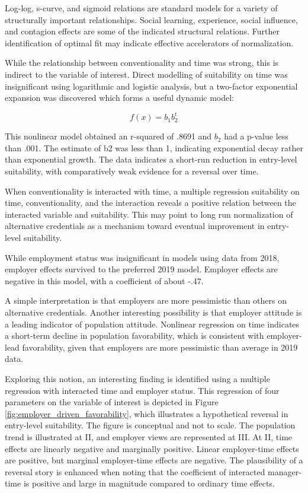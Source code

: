 \documentclass[AER]{./aea-latex-templates/AEA}
\begin{document}
Log-log, s-curve, and sigmoid relations are standard models for a variety of structurally important relationships.
Social learning, experience, social influence, and contagion effects are some of the
indicated structural relations\cite{young2009innovation}.
Further identification of optimal fit may indicate effective accelerators of normalization.

While the relationship between conventionality and time was strong,
this is indirect to the variable of interest. Direct modelling of suitability
on time was insignificant using logarithmic and logistic analysis, but
a two-factor exponential expansion was discovered which forms a useful dynamic model:

\begin{equation} f(x) = b_1b_2^t \end{equation}

This nonlinear model obtained an r-squared of .8691 and $b_2$ had a p-value
less than .001. The estimate of b2 was less than 1, indicating exponential
decay rather than exponential growth. The data indicates a short-run reduction in entry-level
suitability, with comparatively weak evidence for a reversal over time.

When conventionality is interacted with time, a multiple regression suitability on time, conventionality, and the interaction
reveals a positive relation between the interacted variable and suitability.
This may point to long run normalization of alternative credentials as a mechanism toward eventual improvement in entry-level suitability.

While employment status was insignificant in models using data from 2018,
employer effects survived to the preferred 2019 model.
Employer effects are negative in this model, with a coefficient of about -.47.

A simple interpretation is that employers are more pessimistic than others
on alternative credentials. Another interesting possibility is that employer attitude is a leading indicator of population attitude.
Nonlinear regression on time indicates a short-term decline in population favorability,
which is consistent with employer-lead favorability, given that employers are more pessimistic than average in 2019 data.

Exploring this notion, an interesting finding is identified using a multiple regression with interacted time and employer status.
This regression of four parameters on the variable of interest is depicted in
Figure \ref{fig:employer_driven_favorability}, which illustrates a hypothetical reversal in entry-level
suitability. The figure is conceptual and not to scale. The population
trend is illustrated at II, and employer views are represented at III. At II,
time effects are linearly negative and marginally positive. Linear
employer-time effects are positive, but marginal employer-time effects are
negative. The plausibility of a reversal story is enhanced when noting
that the coefficient of interacted manager-time is positive and large in magnitude compared to ordinary time effects.
\end{document}
